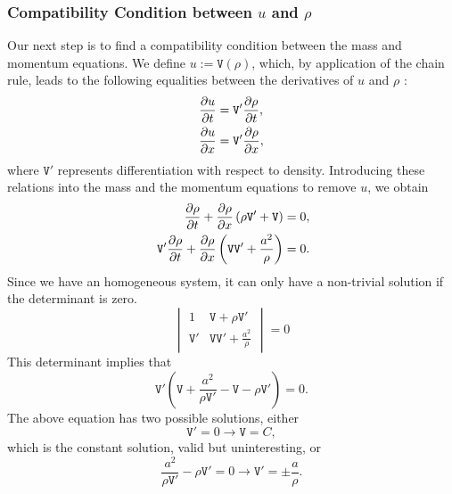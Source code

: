 \documentclass[../../thesis.tex]{subfiles}
\begin{document}
\subsubsection*{Compatibility Condition between $u$ and $\rho$}
Our next step is to find a compatibility condition between the mass and momentum equations.
We define $u:=\mathtt{V}(\rho)$, which, by application of the chain rule, leads to the following equalities between the derivatives of $u$ and $\rho$ :
\begin{subequations}
    \begin{align}
        \pdv{u}{t} &= \mathtt{V}' \pdv{\rho}{t}, \\
        \pdv{u}{x} &= \mathtt{V}' \pdv{\rho}{x},
    \end{align}
\end{subequations}
where $\mathtt{V}'$ represents differentiation with respect to density.
Introducing these relations into the mass and the momentum equations to remove $u$, we obtain
\begin{subequations}
    \begin{align}
            \pdv{\rho}{t} + \pdv{\rho}{x} \left(\rho \mathtt{V}' + \mathtt{V}\right) &= 0, 
            \\ 
            \mathtt{V}' \pdv{\rho}{t} + \pdv{\rho}{x} \left(\mathtt{V} \mathtt{V}' + \frac{a^2}{\rho}\right) &= 0.
    \end{align}
\end{subequations}
Since we have an homogeneous system, it can only have a non-trivial solution if the determinant is zero.
\begin{equation}
    \begin{vmatrix}
        1 & \mathtt{V} + \rho \mathtt{V}'\\ 
        \mathtt{V}' &  \mathtt{V}\mathtt{V}' + \frac{a^2}{\rho} 
    \end{vmatrix}
    = 0
\end{equation}
This determinant implies that
\begin{equation}
    \mathtt{V}' \left(\mathtt{V} + \frac{a^2}{\rho \mathtt{V}'} - \mathtt{V} - \rho \mathtt{V}'\right) = 0.
\end{equation}
The above equation has two possible solutions, either 
\begin{equation}
    \mathtt{V}'=0 \rightarrow \mathtt{V} = C,
\end{equation} 
which is the constant solution, valid but uninteresting, or 
\begin{equation}
    \frac{a^2}{\rho \mathtt{V}'} - \rho \mathtt{V}' = 0 \rightarrow \mathtt{V}' = \pm \frac{a}{\rho}.
\end{equation}
\end{document}
